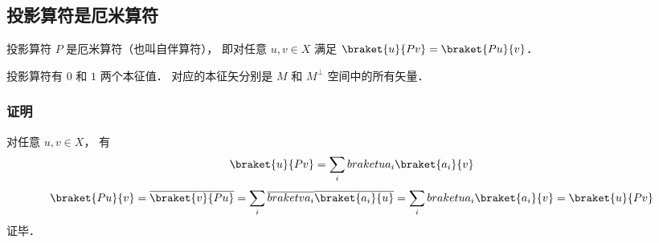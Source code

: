 \subsection{投影算符是厄米算符}
投影算符 $P$ 是厄米算符（也叫自伴算符）， 即对任意 $u, v\in X$ 满足 $\braket{u}{Pv} = \braket{Pu}{v}$．

投影算符有 $0$ 和 $1$ 两个本征值． 对应的本征矢分别是 $M$ 和 $M^\bot$ 空间中的所有矢量．

\subsubsection{证明}
对任意 $u, v\in X$， 有
\begin{equation}
\braket{u}{Pv} = \sum_i \\braket{u}{a_i}\braket{a_i}{v}
\end{equation}
\begin{equation}
\braket{Pu}{v} = \overline {\braket{v}{Pu}} = \sum_i \overline{\\braket{v}{a_i}}\overline{\braket{a_i}{u}} = \sum_i \\braket{u}{a_i}\braket{a_i}{v} = \braket{u}{Pv}
\end{equation}
证毕．
